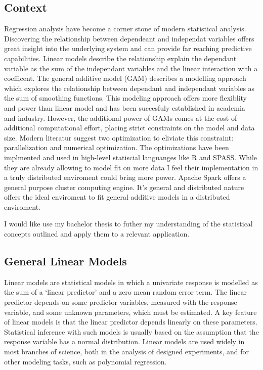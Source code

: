 \documentclass{article}
\begin{document}
    \subsection{Context}
    Regression analysis have become a corner stone of modern statistical analysis. Discovering the relationship between dependeant and independat variables offers great insight into the underlying system and can provide far reaching predictive capabilities. Linear models describe the relationship explain the dependant variable as the sum of the independant variables and the linear interaction with a coefficent. The general additive model (GAM) describes a modelling approach which explores the relationship between dependant and independant variables as the sum of smoothing functions. This modeling approach offers more flexiblity and power than linear model and has been succesfuly established in academia and industry. However, the additional power of GAMs comes at the cost of additional computational effort, placing strict constraints on the model and data size. Modern literatur suggest two optimization to eliviate this constraint: parallelization and numerical optimization.
    The optimizations have been implmented and used in high-level statiscial languanges like R and SPASS. While they are already allowing to model fit on more data I feel their implementation in a truly distributed enviroment could bring more power. Apache Spark offers a general purpose cluster computing engine. It's general and distributed nature offers the ideal enviroment to fit general additive models in a distributed enviroment.

    I would like use my bachelor thesis to futher my understanding of the statistical concepts outlined and apply them to a relevant application.

    \subsection{General Linear Models}
    Linear models are statistical models in which a univariate response is modelled as the sum of a ‘linear predictor’ and a zero mean random error term. The linear predictor depends on some predictor variables, measured with the response variable, and some unknown parameters, which must be estimated. A key feature of linear models is that the linear predictor depends linearly on these parameters. Statistical inference with such models is usually based on the assumption that the response variable has a normal distribution. Linear models are used widely in most branches of science, both in the analysis of designed experiments, and for other modeling tasks, such as polynomial regression.
\end{document}

